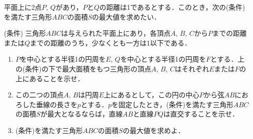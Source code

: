 平面上に2点$P$, $Q$があり，$P$と$Q$の距離は1であるとする．このとき，次の(条件)を満たす三角形$ABC$の面積$S$の最大値を求めたい．

(条件) 三角形$ABC$は与えられた平面上にあり，各頂点$A$, $B$, $C$から$P$までの距離または$Q$までの距離のうち，少なくとも一方は1以下である．

\begin{enumerate}
  \item $P$を中心とする半径1の円周を$E$, $Q$を中心とする半径1の円周を$F$とする．上の(条件)の下で最大面積をもつ三角形の頂点$A$, $B$, $C$はそれぞれ$E$または$F$の上にあることを示せ．
  \item この二つの頂点$A$, $B$は円周$E$上にあるとして，この円の中心$P$から弦$AB$におろした垂線の長さを$p$とする．$p$を固定したとき，(条件)を満たす三角形$ABC$の面積$S$が最大となるならば，直線$AB$と直線$PQ$は直交することを示せ．
  \item (条件)を満たす三角形$ABC$の面積$S$の最大値を求めよ．
\end{enumerate}

